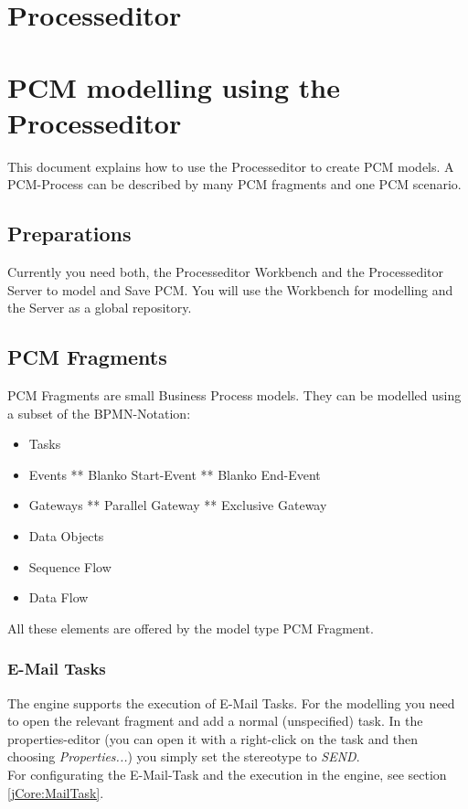 
%
%
\section{Processeditor}

%
%
\section{PCM modelling using the Processeditor}
\label{pcm-modelling-using-the-processeditor}
This document explains how to use the Processeditor to create PCM models. A PCM-Process can be described by many PCM fragments and one PCM scenario.

%
%
\subsection{Preparations}
\label{preparations}
Currently you need both, the Processeditor Workbench and the Processeditor Server to model and Save PCM. You will use the Workbench for modelling and the Server as a global repository.

%
%
\subsection{PCM Fragments}
\label{pcm-fragments}
PCM Fragments are small Business Process models. They can be modelled using a subset of the BPMN-Notation:

\begin{itemize}
\itemsep1pt\parskip0pt
\item
  Tasks
\item
  Events ** Blanko Start-Event ** Blanko End-Event
\item
  Gateways ** Parallel Gateway ** Exclusive Gateway
\item
  Data Objects
\item
  Sequence Flow
\item
  Data Flow
\end{itemize}

All these elements are offered by the model type PCM Fragment.

\subsubsection{E-Mail Tasks}
\label{pe:email}
The engine supports the execution of E-Mail Tasks. For the modelling you need to open the relevant fragment and add a normal (unspecified) task. In the properties-editor (you can open it with a right-click on the task and then choosing \textit{Properties...}) you simply set the stereotype to \textit{SEND}.\\
For configurating the E-Mail-Task and the execution in the engine, see section \ref{jCore:MailTask}.

